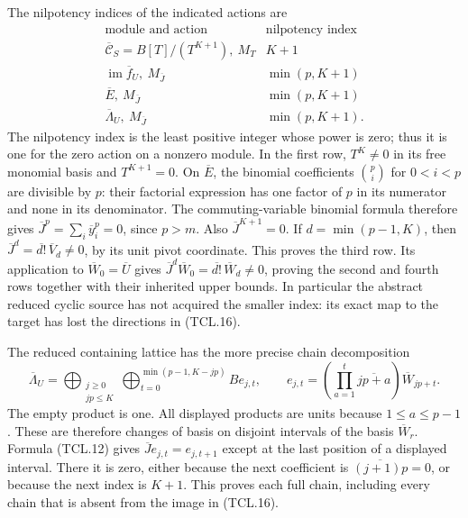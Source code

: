 The nilpotency indices of the indicated actions are
\[
 \begin{array}{c|c}
 \text{module and action}&\text{nilpotency index}\\ \hline
 \overline{\mathcal C}_S=B[T]/(T^{K+1}),\ M_T&K+1\\
 \operatorname{im}\overline f_U,\ M_{\overline J}
           &\min(p,K+1)\\
 \overline E,\ M_{\overline J}&\min(p,K+1)\\
 \overline\Lambda_U,\ M_{\overline J}&\min(p,K+1).
 \end{array}
 \tag{TCL.17}\label{eq:tcl-indices}
\]
The nilpotency index is the least positive integer whose power is
zero; thus it is one for the zero action on a nonzero module.
In the first row, \(T^K\ne0\) in its free monomial basis and
\(T^{K+1}=0\). On \(\overline E\), the binomial coefficients
\(\binom pi\) for \(0<i<p\) are divisible by \(p\): their
factorial expression has one factor of \(p\) in its numerator
and none in its denominator. The commuting-variable binomial
formula therefore gives
\(\overline J^p=\sum_i\overline y_i^p=0\), since \(p>m\).
Also \(\overline J^{K+1}=0\). If
\(d=\min(p-1,K)\), then
\(\overline J^d=\overline{d!}\,\overline V_d\ne0\), by its
unit pivot coordinate. This proves the third row. Its application
to \(\overline W_0=\overline U\) gives
\(\overline J^d\overline W_0
=\overline{d!}\,\overline W_d\ne0\), proving the second and
fourth rows together with their inherited upper bounds.
In particular the abstract reduced cyclic source has not acquired
the smaller index: its exact map to the target has lost the
directions in (TCL.16).

The reduced containing lattice has the more precise chain decomposition
\[
 \overline\Lambda_U=
 \bigoplus_{\substack{j\geq0\\jp\leq K}}
       \bigoplus_{t=0}^{\min(p-1,K-jp)} B e_{j,t},\qquad
 e_{j,t}=\left(\prod_{a=1}^t\overline{jp+a}\right)
                          \overline W_{jp+t}.
 \tag{TCL.18}\label{eq:tcl-divided-chains}
\]
The empty product is one. All displayed products are units because
\(1\leq a\leq p-1\). These are therefore changes of basis on
disjoint intervals of the basis \(\overline W_r\). Formula
(TCL.12) gives \(\overline J e_{j,t}=e_{j,t+1}\) except at the
last position of a displayed interval. There it is zero, either
because the next coefficient is \(\overline{(j+1)p}=0\), or
because the next index is \(K+1\). This proves each full chain,
including every chain that is absent from the image in (TCL.16).

